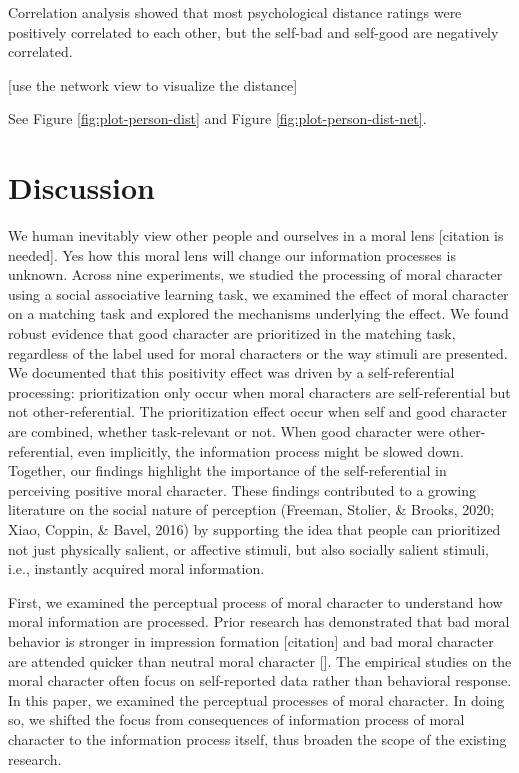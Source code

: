 \documentclass[
  man]{apa6}
\begin{document}
Correlation analysis showed that most psychological distance ratings were positively correlated to each other, but the self-bad and self-good are negatively correlated.

{[}use the network view to visualize the distance{]}

See Figure \ref{fig:plot-person-dist} and Figure \ref{fig:plot-person-dist-net}.

\hypertarget{discussion}{%
\section{Discussion}\label{discussion}}

We human inevitably view other people and ourselves in a moral lens {[}citation is needed{]}. Yes how this moral lens will change our information processes is unknown. Across nine experiments, we studied the processing of moral character using a social associative learning task, we examined the effect of moral character on a matching task and explored the mechanisms underlying the effect. We found robust evidence that good character are prioritized in the matching task, regardless of the label used for moral characters or the way stimuli are presented. We documented that this positivity effect was driven by a self-referential processing: prioritization only occur when moral characters are self-referential but not other-referential. The prioritization effect occur when self and good character are combined, whether task-relevant or not. When good character were other-referential, even implicitly, the information process might be slowed down. Together, our findings highlight the importance of the self-referential in perceiving positive moral character. These findings contributed to a growing literature on the social nature of perception (Freeman, Stolier, \& Brooks, 2020; Xiao, Coppin, \& Bavel, 2016) by supporting the idea that people can prioritized not just physically salient, or affective stimuli, but also socially salient stimuli, i.e., instantly acquired moral information.

First, we examined the perceptual process of moral character to understand how moral information are processed. Prior research has demonstrated that bad moral behavior is stronger in impression formation {[}citation{]} and bad moral character are attended quicker than neutral moral character {[}{]}. The empirical studies on the moral character often focus on self-reported data rather than behavioral response. In this paper, we examined the perceptual processes of moral character. In doing so, we shifted the focus from consequences of information process of moral character to the information process itself, thus broaden the scope of the existing research.
\end{document}
